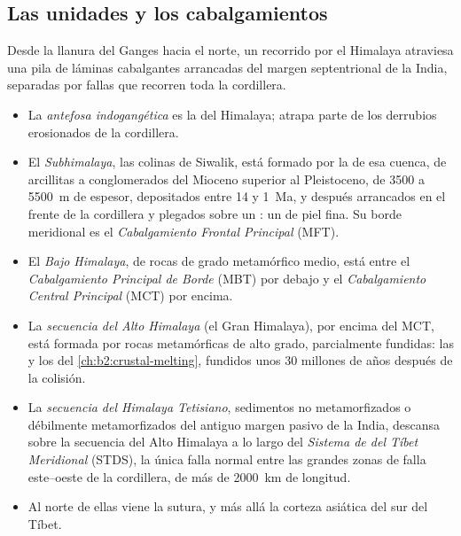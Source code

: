 \subsection{Las unidades y los cabalgamientos}

Desde la llanura del Ganges hacia el norte, un recorrido por el Himalaya atraviesa una pila de láminas cabalgantes
arrancadas del margen septentrional de la India, separadas por fallas que recorren toda la cordillera.
\begin{itemize}
\item La \emph{antefosa indogangética} es la  del Himalaya; atrapa parte de
los derrubios erosionados de la cordillera.
\item El \emph{Subhimalaya}, las colinas de Siwalik, está formado por la  de esa cuenca,
de arcillitas a conglomerados del Mioceno superior al Pleistoceno, de 3500 a \qty{5500}{m} de espesor,
depositados entre 14 y \qty{1}{Ma}, y después arrancados en el frente de la cordillera y plegados sobre un
: un  de piel fina. Su borde meridional es el \emph{Cabalgamiento Frontal
Principal} (MFT).
\item El \emph{Bajo Himalaya}, de rocas de grado metamórfico medio, está entre el
\emph{Cabalgamiento Principal de Borde} (MBT) por debajo y el \emph{Cabalgamiento Central Principal} (MCT) por encima.
\item La \emph{secuencia del Alto Himalaya} (el Gran Himalaya), por encima del MCT, está formada por
rocas metamórficas de alto grado, parcialmente fundidas: las  y los  del
\cref{ch:b2:crustal-melting}, fundidos unos 30 millones de años después de la colisión.
\item La \emph{secuencia del Himalaya Tetisiano}, sedimentos no metamorfizados o débilmente metamorfizados
del antiguo margen pasivo de la India, descansa sobre la secuencia del Alto Himalaya a lo largo del
\emph{Sistema de  del Tíbet Meridional} (STDS), la única falla normal entre las grandes
zonas de falla este--oeste de la cordillera, de más de \qty{2000}{km} de longitud.
\item Al norte de ellas viene la sutura, y más allá la corteza asiática del sur del Tíbet.
\end{itemize}

